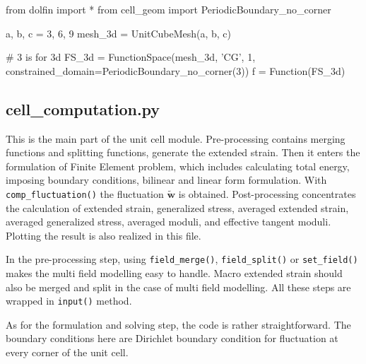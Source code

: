 \documentclass[10pt,a4paper]{scrreprt}
\begin{document}
\begin{python}
from dolfin import *
from cell_geom import PeriodicBoundary_no_corner

a, b, c = 3, 6, 9
mesh_3d = UnitCubeMesh(a, b, c)

# 3 is for 3d
FS_3d = FunctionSpace(mesh_3d, 'CG', 1, constrained_domain=PeriodicBoundary_no_corner(3))
f = Function(FS_3d)
\end{python}

\subsection{cell\_computation.py}
This is the main part of the unit cell module. Pre-processing contains merging functions and splitting functions, generate the extended strain. Then it enters the formulation of Finite Element problem, which includes calculating total energy, imposing boundary conditions, bilinear and linear form formulation. With \texttt{comp\_fluctuation()} the fluctuation $\widetilde{\mathbf{w}}$ is obtained. Post-processing concentrates the calculation of extended strain, generalized stress, averaged extended strain, averaged generalized stress, averaged moduli, and effective tangent moduli. Plotting the result is also realized in this file.

In the pre-processing step, using \texttt{field\_merge()}, \texttt{field\_split()} or \texttt{set\_field()} makes the multi field modelling easy to handle. Macro extended strain should also be merged and split in the case of multi field modelling. All these steps are wrapped in \texttt{input()} method.

As for the formulation and solving step, the code is rather straightforward. The boundary conditions here are Dirichlet boundary condition for fluctuation at every corner of the unit cell.
\end{document}
